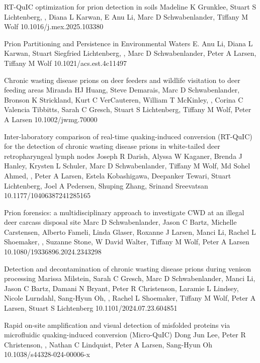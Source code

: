 \documentclass{resume}
\begin{document}
        \begin{samepage}
            {RT-QuIC optimization for prion detection in soils}
            {Madeline K Grunklee, Stuart S Lichtenberg, \me{}, Diana L Karwan, E Anu Li, Marc D Schwabenlander, Tiffany M Wolf}
            {10.1016/j.mex.2025.103380}

            {Prion Partitioning and Persistence in Environmental Waters}
            {E. Anu Li, Diana L Karwan, Stuart Siegfried Lichtenberg, \me{}, Marc D Schwabenlander, Peter A Larsen, Tiffany M Wolf}
            {10.1021/acs.est.4c11497}

            {Chronic wasting disease prions on deer feeders and wildlife visitation to deer feeding areas}
            {Miranda HJ Huang, Steve Demarais, Marc D Schwabenlander, Bronson K Strickland, Kurt C VerCauteren, William T McKinley, \me{}, Corina C Valencia Tibbitts, Sarah C Gresch, Stuart S Lichtenberg, Tiffany M Wolf, Peter A Larsen}
            {10.1002/jwmg.70000}

            {Inter-laboratory comparison of real-time quaking-induced conversion (RT-QuIC) for the detection of chronic wasting disease prions in white-tailed deer retropharyngeal lymph nodes}
            {Joseph R Darish, Alyssa W Kaganer, Brenda J Hanley, Krysten L Schuler, Marc D Schwabenlander, Tiffany M Wolf, Md Sohel Ahmed, \me{}, Peter A Larsen, Estela Kobashigawa, Deepanker Tewari, Stuart Lichtenberg, Joel A Pedersen, Shuping Zhang, Srinand Sreevatsan}
            {10.1177/10406387241285165}

            {Prion forensics: a multidisciplinary approach to investigate CWD at an illegal deer carcass disposal site}
            {Marc D Schwabenlander, Jason C Bartz, Michelle Carstensen, Alberto Fameli, Linda Glaser, Roxanne J Larsen, Manci Li, Rachel L Shoemaker, \me{}, Suzanne Stone, W David Walter, Tiffany M Wolf, Peter A Larsen}
            {10.1080/19336896.2024.2343298}

            {Detection and decontamination of chronic wasting disease prions during venison processing}
            {Marissa Milstein, Sarah C Gresch, Marc D Schwabenlander, Manci Li, Jason C Bartz, Damani N Bryant, Peter R Christenson, Laramie L Lindsey, Nicole Lurndahl, Sang-Hyun Oh, \me{}, Rachel L Shoemaker, Tiffany M Wolf, Peter A Larsen, Stuart S Lichtenberg}
            {10.1101/2024.07.23.604851}

            {Rapid on-site amplification and visual detection of misfolded proteins via microfluidic quaking-induced conversion (Micro-QuIC)}
            {Dong Jun Lee, Peter R Christenson, \me{}, Nathan C Lindquist, Peter A Larsen, Sang-Hyun Oh}
            {10.1038/s44328-024-00006-x}


\end{samepage}
\end{document}
